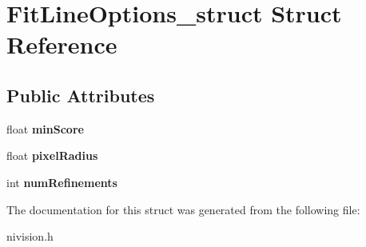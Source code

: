 \hypertarget{structFitLineOptions__struct}{
\section{FitLineOptions\_\-struct Struct Reference}
\label{structFitLineOptions__struct}
}
\subsection*{Public Attributes}
\begin{DoxyCompactItemize}
\item 
\hypertarget{structFitLineOptions__struct_ad67f234d82754ed18966e3328878e378}{
float {\bfseries minScore}}
\label{structFitLineOptions__struct_ad67f234d82754ed18966e3328878e378}

\item 
\hypertarget{structFitLineOptions__struct_a98bf1643e9d88cd762133060d5c874d6}{
float {\bfseries pixelRadius}}
\label{structFitLineOptions__struct_a98bf1643e9d88cd762133060d5c874d6}

\item 
\hypertarget{structFitLineOptions__struct_aef02bd82513aed7d209e0ad9319599c0}{
int {\bfseries numRefinements}}
\label{structFitLineOptions__struct_aef02bd82513aed7d209e0ad9319599c0}

\end{DoxyCompactItemize}


The documentation for this struct was generated from the following file:\begin{DoxyCompactItemize}
\item 
nivision.h\end{DoxyCompactItemize}
